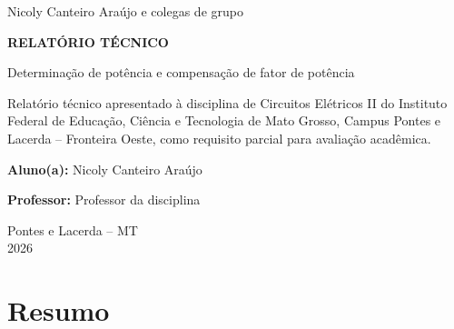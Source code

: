 \documentclass[12pt,a4paper]{article}
\begin{document}
\begin{titlepage}
\thispagestyle{empty}

\begin{center}

\vspace*{2.5cm}

{\large Nicoly Canteiro Araújo e colegas de grupo}

\vspace{2.5cm}

{\Large \textbf{RELATÓRIO TÉCNICO}}

\vspace{0.8cm}

{\large Determinação de potência e compensação de fator de potência}

\end{center}

\vspace{2.5cm}

\hspace*{7.5cm}
\begin{minipage}{7.5cm}
Relatório técnico apresentado à disciplina de Circuitos Elétricos II do Instituto Federal de Educação, Ciência e Tecnologia de Mato Grosso, Campus Pontes e Lacerda -- Fronteira Oeste, como requisito parcial para avaliação acadêmica.
\end{minipage}

\vspace{2cm}

\noindent
\textbf{Aluno(a):} Nicoly Canteiro Araújo

\vspace{0.3cm}


\vspace{0.3cm}

\noindent
\textbf{Professor:} Professor da disciplina

\vfill

\begin{center}
Pontes e Lacerda -- MT\\
2026
\end{center}

\end{titlepage}

\newpage
\section*{Resumo}
\end{document}
